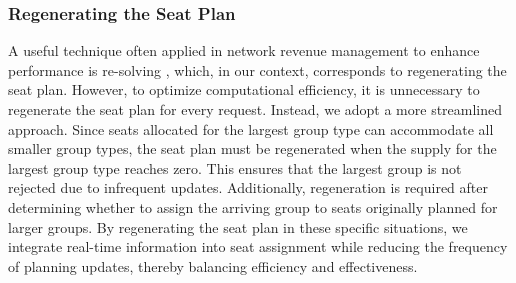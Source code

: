 



\subsubsection{Regenerating the Seat Plan}
A useful technique often applied in network revenue management to enhance performance is re-solving \citep{secomandi2008analysis, jasin2012re}, which, in our context, corresponds to regenerating the seat plan. However, to optimize computational efficiency, it is unnecessary to regenerate the seat plan for every request. Instead, we adopt a more streamlined approach. Since seats allocated for the largest group type can accommodate all smaller group types, the seat plan must be regenerated when the supply for the largest group type reaches zero. This ensures that the largest group is not rejected due to infrequent updates. Additionally, regeneration is required after determining whether to assign the arriving group to seats originally planned for larger groups. By regenerating the seat plan in these specific situations, we integrate real-time information into seat assignment while reducing the frequency of planning updates, thereby balancing efficiency and effectiveness.

